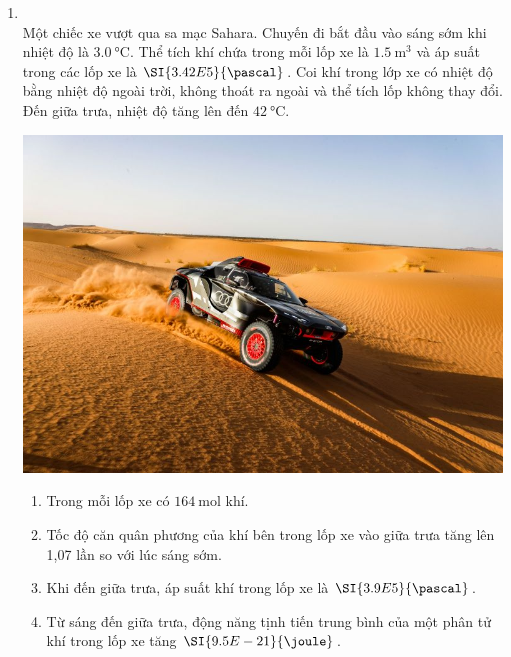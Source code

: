 \begin{enumerate}[label=\bfseries Câu \arabic*:, leftmargin=1.7cm]
\item {}\\
Một chiếc xe vượt qua sa mạc Sahara. Chuyến đi bắt đầu vào sáng sớm khi nhiệt độ là $\SI{3.0}{\celsius}$. Thể tích khí chứa trong mỗi lốp xe là $\SI{1.5}{\meter^3}$ và áp suất trong các lốp xe là $\SI{3.42E5}{\pascal}$. Coi khí trong lớp xe có nhiệt độ bằng nhiệt độ ngoài trời, không thoát ra ngoài và thể tích lốp không thay đổi. Đến giữa trưa, nhiệt độ tăng lên đến $\SI{42}{\celsius}$.
\begin{center}
	\includegraphics[width=0.35\linewidth]{../figs/VN12-Y24-PH-SYL-015P-2}
\end{center}
\begin{enumerate}[label=\alph*)]
	\item  Trong mỗi lốp xe có $\SI{164}{\mole}$ khí.
	\item Tốc độ căn quân phương của khí bên trong lốp xe vào giữa trưa tăng lên 1,07 lần so với lúc sáng sớm.
	\item Khi đến giữa trưa, áp suất khí trong lốp xe là $\SI{3.9E5}{\pascal}$.
	\item Từ sáng đến giữa trưa, động năng tịnh tiến trung bình của một phân tử khí trong lốp xe tăng $\SI{9.5E-21}{\joule}$.
\end{enumerate}


\end{enumerate}
